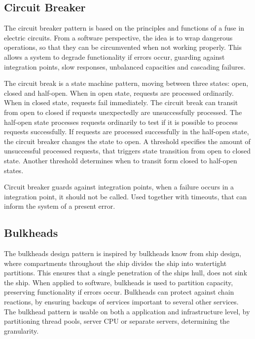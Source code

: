 
\subsection{Circuit Breaker}
The circuit breaker pattern is based on the principles and functions of a fuse in electric circuits. From a software perspective, the idea is to wrap dangerous operations, so that they can be circumvented when not working properly. This allows a system to degrade functionality if errors occur, guarding against integration points, slow responses, unbalanced capacities and cascading failures.

The circuit break is a state machine pattern, moving between three states: open, closed and half-open. When in open state, requests are processed ordinarily. When in closed state, requests fail immediately. The circuit break can transit from open to closed if requests unexpectedly are unsuccessfully processed. The half-open state processes requests ordinarily to test if it is possible to process requests successfully. If requests are processed successfully in the half-open state, the circuit breaker changes the state to open. A threshold specifies the amount of unsuccessful processed requests, that triggers state transition from open to closed state. Another threshold determines when to transit form closed to half-open states.

Circuit breaker guards against integration points, when a failure occurs in a integration point, it should not be called. Used together with timeouts, that can inform the system of a present error.



\subsection{Bulkheads}
The bulkheads design pattern is inspired by bulkheads know from ship design, where compartments throughout the ship divides the ship into watertight partitions. This ensures that a single penetration of the ships hull, does not sink the ship. When applied to software, bulkheads is used to partition capacity, preserving functionality if errors occur. Bulkheads can protect against chain reactions, by ensuring backups of services important to several other services. The bulkhead pattern is usable on both a application and infrastructure level, by partitioning thread pools, server CPU or separate servers, determining the granularity. 


